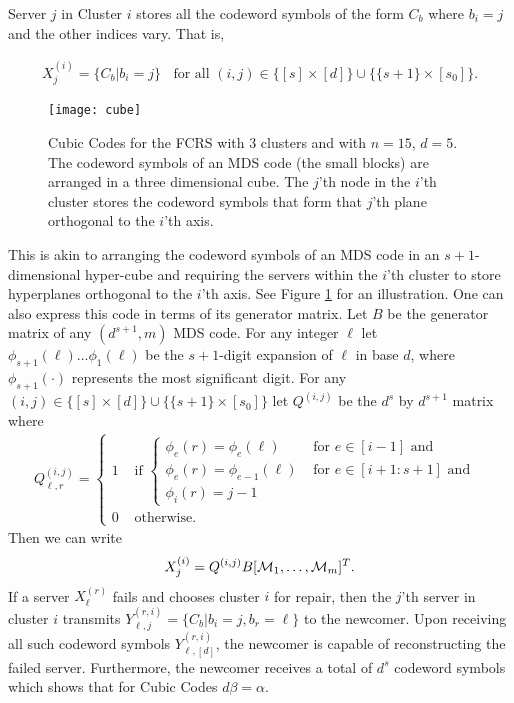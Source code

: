 \documentclass[journal,onecolumn,draftcls]{IEEEtran}
\begin{document}
Server $j$ in Cluster $i$ stores all the codeword symbols of the form $C_b$ where $b_i = j$ and the other indices vary. That is,

\begin{eqnarray*}
X^{(i)}_j  = \{C_b |b_i = j\} \;\;\mbox{ for all } (i,j)\in \{[s]\times[d]\}\cup \{\{s+1\}\times[s_0]\}.
\end{eqnarray*}
\begin{figure}[h]
\centering
\texttt{[image: cube]}
\caption{Cubic Codes for the FCRS with 3 clusters and with $n = 15$, $d = 5$. The codeword symbols of an MDS code (the small blocks) are arranged in a three dimensional cube. The $j$'th node in the $i$'th cluster stores the codeword symbols that form that $j$'th plane orthogonal to the $i$'th axis.}
\label{fig:cubic}
\end{figure}
This is akin to arranging the codeword symbols of an MDS code in an $s+1$-dimensional hyper-cube and requiring the servers within the $i$'th cluster to store hyperplanes orthogonal to the $i$'th axis. See Figure \ref{fig:cubic} for an illustration. One can also express this code in terms of its generator matrix. Let $B$ be the generator matrix of any $(d^{s+1},m)$ MDS code. For any integer $\ell$ let $\phi_{s+1}(\ell)\dots \phi_1(\ell)$ be the $s+1$-digit expansion of $\ell$ in base $d$, where $\phi_{s+1}(\cdot)$ represents the most significant digit. For any $(i,j)\in \{[s]\times[d]\}\cup \{\{s+1\}\times[s_0]\}$ let $Q^{(i,j)}$ be the $d^s$ by $d^{s+1}$ matrix where 
\begin{eqnarray*}
Q^{(i,j)}_{\ell,r} = \begin{cases}
1 & \mbox{ if } \begin{cases} \phi_e(r) =\phi_e(\ell) & \mbox{ for }e\in[i-1]\mbox{ and } \\ \phi_e(r) = \phi_{e-1}(\ell)  &\mbox{ for } e\in[i+1:s+1] \mbox{ and }\\ \phi_{i}(r) = j-1&\mbox{}\end{cases}\\ 
0 & \mbox{ otherwise. } 
\end{cases}
\end{eqnarray*}
 Then we can write
\begin{eqnarray*}
X^{(i)}_{j} = Q^{(i,j)}B[{\cal M}_1,\dots,{\cal M}_m]^T.
\end{eqnarray*}
If a server $X^{(r)}_\ell$ fails and chooses cluster $i$ for repair, then the $j$'th server in cluster $i$ transmits $Y^{(r,i)}_{\ell,j} = \{C_{b}| b_i = j, b_r = \ell\}$ to the newcomer. Upon receiving all such codeword symbols $Y^{(r,i)}_{\ell,[d]}$, the newcomer is capable of reconstructing the failed server. Furthermore, the newcomer receives a total of $d^{s}$ codeword symbols which shows that for Cubic Codes $d\beta = \alpha$. 
\end{document}
